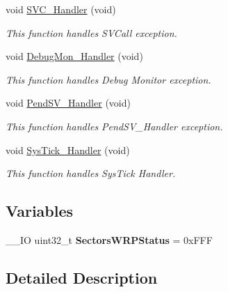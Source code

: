 \begin{DoxyCompactItemize}
void \hyperlink{group___f_l_a_s_h___write___protection_ga3e5ddb3df0d62f2dc357e64a3f04a6ce}{S\-V\-C\-\_\-\-Handler} (void)
\begin{DoxyCompactList}\small\item\em This function handles S\-V\-Call exception. \end{DoxyCompactList}\item 
void \hyperlink{group___f_l_a_s_h___write___protection_gadbdfb05858cc36fc520974df37ec3cb0}{Debug\-Mon\-\_\-\-Handler} (void)
\begin{DoxyCompactList}\small\item\em This function handles Debug Monitor exception. \end{DoxyCompactList}\item 
void \hyperlink{group___f_l_a_s_h___write___protection_ga6303e1f258cbdc1f970ce579cc015623}{Pend\-S\-V\-\_\-\-Handler} (void)
\begin{DoxyCompactList}\small\item\em This function handles Pend\-S\-V\-\_\-\-Handler exception. \end{DoxyCompactList}\item 
void \hyperlink{group___f_l_a_s_h___write___protection_gab5e09814056d617c521549e542639b7e}{Sys\-Tick\-\_\-\-Handler} (void)
\begin{DoxyCompactList}\small\item\em This function handles Sys\-Tick Handler. \end{DoxyCompactList}\end{DoxyCompactItemize}
\subsection*{Variables}
\begin{DoxyCompactItemize}
\item 
\hypertarget{group___f_l_a_s_h___write___protection_ga79291462d829cfb0a180e2182ef68164}{\-\_\-\-\_\-\-I\-O uint32\-\_\-t {\bfseries Sectors\-W\-R\-P\-Status} = 0x\-F\-F\-F}\label{group___f_l_a_s_h___write___protection_ga79291462d829cfb0a180e2182ef68164}

\end{DoxyCompactItemize}


\subsection{Detailed Description}


